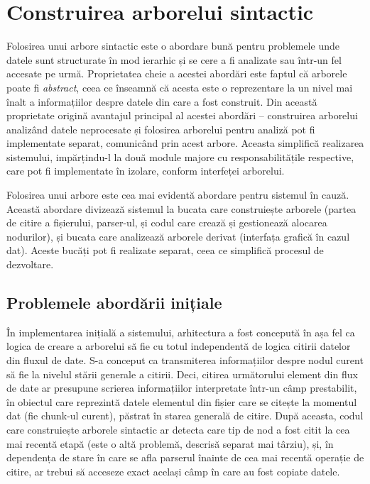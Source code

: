\documentclass[a4paper,12pt]{report}
\begin{document}
\section{Construirea arborelui sintactic}

Folosirea unui arbore sintactic este o abordare bună pentru problemele 
unde datele sunt structurate în mod ierarhic și se cere a fi analizate sau într-un fel accesate pe urmă.
Proprietatea cheie a acestei abordări este faptul că arborele poate fi \textit{abstract},
ceea ce înseamnă că acesta este o reprezentare la un nivel mai înalt a informațiilor despre datele
din care a fost construit.
Din această proprietate origină avantajul principal al acestei abordări --
construirea arborelui analizând datele neprocesate și folosirea arborelui
pentru analiză pot fi implementate separat, comunicând prin acest arbore.
Aceasta simplifică realizarea sistemului, impărțindu-l la două module majore cu responsabilitățile respective,
care pot fi implementate în izolare, conform interfeței arborelui.

Folosirea unui arbore este cea mai evidentă abordare pentru sistemul în cauză.
Această abordare divizează sistemul la bucata care construiește arborele
(partea de citire a fișierului, parser-ul, și codul care crează și gestionează alocarea nodurilor),
și bucata care analizează arborele derivat (interfața grafică în cazul dat).
Aceste bucăți pot fi realizate separat, ceea ce simplifică procesul de dezvoltare.

\subsection{Problemele abordării inițiale}

În implementarea inițială a sistemului, arhitectura a fost concepută în așa fel ca
logica de creare a arborelui să fie cu totul independentă de logica citirii datelor din fluxul de date.
S-a conceput ca transmiterea informațiilor despre nodul curent să fie la nivelul stării generale a citirii.
Deci, citirea următorului element din flux de date ar presupune scrierea informațiilor interpretate
într-un câmp prestabilit, în obiectul care reprezintă datele elementul
din fișier care se citește la momentul dat (fie chunk-ul curent), păstrat în starea generală de citire.
După aceasta, codul care construiește arborele sintactic ar detecta care tip de nod a fost citit la cea mai recentă etapă 
(este o altă problemă, descrisă separat mai târziu),
și, în dependența de stare în care se afla parserul înainte de cea mai recentă operație de citire,
ar trebui să acceseze exact același câmp în care au fost copiate datele.
\end{document}
